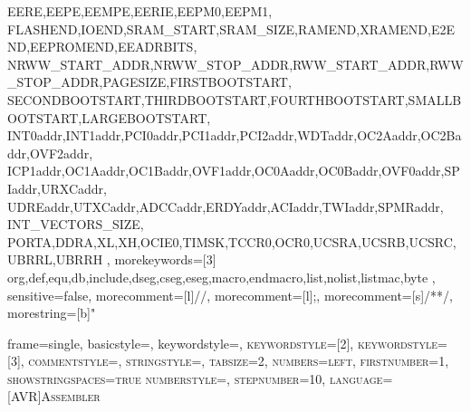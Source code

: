 {{		EERE,EEPE,EEMPE,EERIE,EEPM0,EEPM1,
		FLASHEND,IOEND,SRAM_START,SRAM_SIZE,RAMEND,XRAMEND,E2END,EEPROMEND,EEADRBITS,
		NRWW_START_ADDR,NRWW_STOP_ADDR,RWW_START_ADDR,RWW_STOP_ADDR,PAGESIZE,FIRSTBOOTSTART,
		SECONDBOOTSTART,THIRDBOOTSTART,FOURTHBOOTSTART,SMALLBOOTSTART,LARGEBOOTSTART,
		INT0addr,INT1addr,PCI0addr,PCI1addr,PCI2addr,WDTaddr,OC2Aaddr,OC2Baddr,OVF2addr,
		ICP1addr,OC1Aaddr,OC1Baddr,OVF1addr,OC0Aaddr,OC0Baddr,OVF0addr,SPIaddr,URXCaddr,
		UDREaddr,UTXCaddr,ADCCaddr,ERDYaddr,ACIaddr,TWIaddr,SPMRaddr,
		INT_VECTORS_SIZE,
		PORTA,DDRA,XL,XH,OCIE0,TIMSK,TCCR0,OCR0,UCSRA,UCSRB,UCSRC,UBRRL,UBRRH
	},
	morekeywords=[3]
	{
		org,def,equ,db,include,dseg,cseg,eseg,macro,endmacro,list,nolist,listmac,byte
	},
	sensitive=false, %
	morecomment=[l]{//}, %
	morecomment=[l]{;}, %
	morecomment=[s]{/*}{*/}, %
	morestring=[b]" %
}



{
	frame=single, %
	basicstyle=\small\ttfamily, %
	keywordstyle=\scshape\color{Blue}, %
	keywordstyle=[2]\color{Orange}, %
	keywordstyle=[3]\color{Purple}, %
	commentstyle=\color{MyDarkGreen}\small,
	stringstyle=\color{Red},
	tabsize=2, %
	numbers=left, %
	firstnumber=1, %
	showstringspaces=true
	numberstyle=\tiny\color{Blue}, %
	stepnumber=10, %
	language=[AVR]Assembler
}
